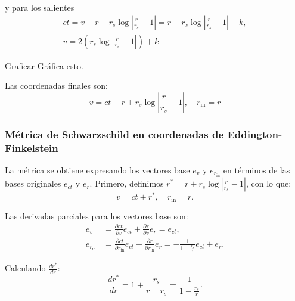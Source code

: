 y para los salientes
\begin{equation}
    \begin{aligned}
        ct = v - r - r_s \log \left| \frac{r}{r_s} - 1 \right|= r + r_s \log \left| \frac{r}{r_s} - 1 \right| + k, \\
        v = 2 \left(r_s \log \left| \frac{r}{r_s} - 1 \right|\right) +k
    \end{aligned}
\end{equation}
\begin{task}{Graficar}{}
    Gráfica esto.
\end{task}
Las coordenadas finales son:
\begin{equation}
    \boxed{
        v = ct + r + r_s \log \left| \frac{r}{r_s} - 1 \right|, \quad
        r_{\text{in}} = r
    }
\end{equation}

\subsubsection{Métrica de Schwarzschild en coordenadas de Eddington-Finkelstein}
La métrica se obtiene expresando los vectores base \( e_v \) y \( e_{r_{\text{in}}} \) en términos de las bases originales \( e_{ct} \) y \( e_r \). Primero, definimos \( r^* = r + r_s \log \left| \frac{r}{r_s} - 1 \right| \), con lo que:
\begin{equation}
    v = ct + r^*, \quad r_{\text{in}} = r.
\end{equation}

Las derivadas parciales para los vectores base son:
\begin{equation}
    \begin{aligned}
        e_v               & = \frac{\partial ct}{\partial v} e_{ct} + \frac{\partial r}{\partial v} e_r = e_{ct},                                                            \\
        e_{r_{\text{in}}} & = \frac{\partial ct}{\partial r_{\text{in}}} e_{ct} + \frac{\partial r}{\partial r_{\text{in}}} e_r = -\frac{1}{1 - \frac{r_s}{r}} e_{ct} + e_r.
    \end{aligned}
\end{equation}

Calculando \( \frac{dr^*}{dr} \):
\begin{equation}
    \frac{dr^*}{dr} = 1 + \frac{r_s}{r - r_s} = \frac{1}{1 - \frac{r_s}{r}}.
\end{equation}

